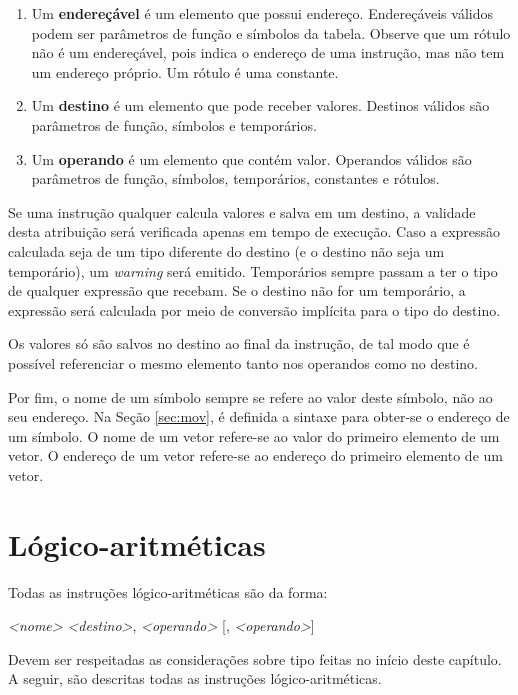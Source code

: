 \documentclass[12pt,a4paper,extrafontsizes,article]{memoir}
\newcommand*{\srcfont}{\fontfamily{pcr}\selectfont}
\begin{document}
\begin{enumerate}
  \item Um \textbf{endereçável} é um elemento que possui endereço. Endereçáveis válidos podem ser parâmetros de função e
  símbolos da tabela. Observe que um rótulo não é um endereçável, pois indica o endereço de uma instrução, mas não
  tem um endereço próprio. Um rótulo é uma constante.
  
  \item Um \textbf{destino} é um elemento que pode receber valores. Destinos válidos são parâmetros de função, símbolos
  e temporários.

  \item Um \textbf{operando} é um elemento que contém valor. Operandos válidos são parâmetros de função, símbolos,
  temporários, constantes e rótulos.
\end{enumerate}

Se uma instrução qualquer calcula valores e salva em um destino, a validade desta atribuição será verificada apenas em
tempo de execução. Caso a expressão calculada seja de um tipo diferente do destino (e o destino não seja um temporário),
um \textit{warning} será emitido. Temporários sempre passam a ter o tipo de qualquer expressão que recebam. Se o
destino não for um temporário, a expressão será calculada por meio de conversão implícita para o tipo do destino.

Os valores só são salvos no destino ao final da instrução, de tal modo que é possível referenciar o mesmo elemento tanto
nos operandos como no destino.

Por fim, o nome de um símbolo sempre se refere ao valor deste símbolo, não ao seu endereço. Na Seção \ref{sec:mov}, é
definida a sintaxe para obter-se o endereço de um símbolo. O nome de um vetor refere-se ao valor do primeiro elemento de
um vetor. O endereço de um vetor refere-se ao endereço do primeiro elemento de um vetor.

\section{Lógico-aritméticas}

Todas as instruções lógico-aritméticas são da forma:

\bigskip
{\srcfont \textit{<nome>} \textit{<destino>}, \textit{<operando>} [, \textit{<operando>}]}
\bigskip

Devem ser respeitadas as considerações sobre tipo feitas no início deste capítulo. A seguir, são descritas todas as
instruções lógico-aritméticas.
\end{document}

